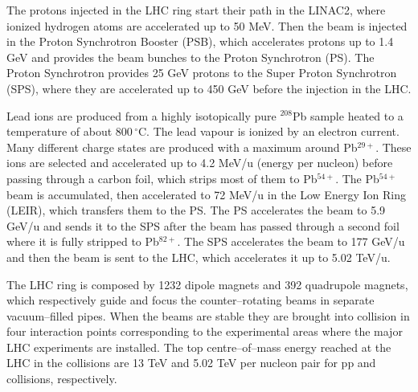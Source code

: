 The protons injected in the LHC ring start their path in the LINAC2, where ionized hydrogen
atoms are accelerated up to 50 MeV. Then the beam is injected in the Proton Synchrotron Booster 
(PSB), which accelerates protons up to 1.4 GeV and provides the beam bunches to the Proton 
Synchrotron (PS). The Proton Synchrotron provides 25 GeV protons to the Super Proton Synchrotron
(SPS), where they are accelerated up to 450 GeV before the injection in the LHC.

Lead ions are produced from a highly isotopically pure $^{208}$Pb sample heated to a temperature
of about $800\,^{\circ}\mathrm{C}$.
The lead vapour is ionized by an electron current. Many different charge states are produced
with a maximum around Pb$^{29+}$.
These ions are selected and accelerated up to 4.2 MeV/u (energy per nucleon) before passing through
a carbon foil, which strips most of them to Pb$^{54+}$. The Pb$^{54+}$ beam is accumulated, then
accelerated to 72 MeV/u in the Low Energy Ion Ring (LEIR), which transfers them to the PS.
The PS accelerates the beam to 5.9 GeV/u and sends it to the SPS after the beam has passed through
a second foil where it is fully stripped to Pb$^{82+}$. 
The SPS accelerates the beam to 177 GeV/u and then the beam is sent to the LHC, which accelerates it
up to 5.02 TeV/u.

The LHC ring is composed by 1232 dipole magnets and 392 quadrupole magnets, which respectively 
guide and focus the counter–rotating beams in separate vacuum–filled pipes.
When the beams are stable they are brought into collision in four interaction points corresponding
to the experimental areas where the major LHC experiments are installed.
The top centre–of–mass energy reached at the LHC in the collisions are 13 TeV and 5.02 TeV per 
nucleon pair for pp and \pPb collisions, respectively.

